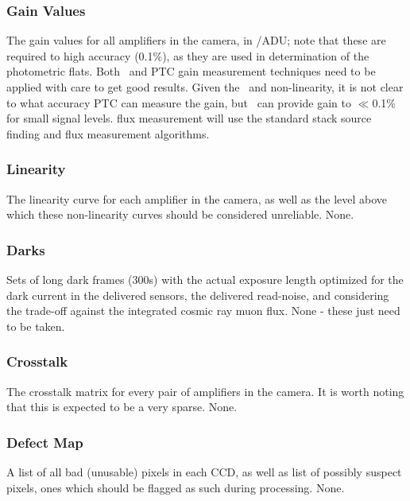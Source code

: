 \subsubsection{Gain Values}\label{sec:CPP:inputs:gain} 
\cameraTeam
The gain values for all amplifiers in the camera, in \electron/ADU; note that these are required to high accuracy (0.1\%), as they are used in determination of the photometric flats.
\alg Both \fefiftyfive\ and PTC gain measurement techniques need to be applied with care to get good results. Given the \bfeffect\ and non-linearity, it is not clear to what accuracy PTC can measure the gain, but \fefiftyfive\ can provide gain to $\ll$0.1\% for small signal levels. \fefiftyfive flux measurement will use the standard stack source finding and flux measurement algorithms.


\subsubsection{Linearity}\label{sec:CPP:inputs:linearityCurve} 
\cameraTeam
The linearity curve for each amplifier in the camera, as well as the level above which these non-linearity curves should be considered unreliable.
\alg None.


\subsubsection{Darks}\label{sec:CPP:inputs:dark}
Sets of long dark frames (\smalltilde 300s) with the actual exposure length optimized for the dark current in the delivered sensors, the delivered read-noise, and considering the trade-off against the integrated cosmic ray muon flux.
\alg None - these just need to be taken.


\subsubsection{Crosstalk}\label{sec:CPP:inputs:crosstalk}
\cameraTeam
The crosstalk matrix for every pair of amplifiers in the camera. It is worth noting that this is expected to be a very sparse.
\alg None.


\subsubsection{Defect Map}\label{sec:CPP:inputs:defectList} 
\cameraTeam
A list of all bad (unusable) pixels in each CCD, as well as list of possibly suspect pixels, \ie ones which should be flagged as such during processing.
\alg None.


